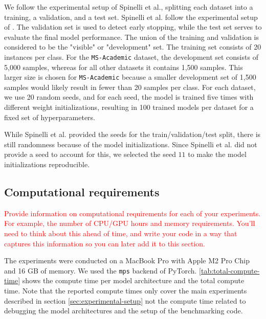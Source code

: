 \documentclass{gdl}
\begin{document}
We follow the experimental setup of Spinelli et al., splitting each dataset into a training, a validation, and a test set. Spinelli et al. follow the experimental setup of \cite{Klicpera2019}. The validation set is used to detect early stopping, while the test set serves to evaluate the final model performance. The union of the training and validation is considered to be the "visible" or "development" set. The training set consists of 20 instances per class. For the \texttt{MS-Academic} dataset, the development set consists of 5,000 samples, whereas for all other datasets it contains 1,500 samples. This larger size is chosen for \texttt{MS-Academic} because a smaller development set of 1,500 samples would likely result in fewer than 20 samples per class. For each dataset, we use 20 random seeds, and for each seed, the model is trained five times with different weight initializations, resulting in 100 trained models per dataset for a fixed set of hyperparameters.

While Spinelli et al. provided the seeds for the train/validation/test split, there is still randomness because of the model initializations. Since Spinelli et al. did not provide a seed to account for this, we selected the seed $11$ to make the model initializations reproducible. 


\subsection{Computational requirements}
\textcolor{red}{Provide information on computational requirements for each of your experiments. For example, the number of CPU/GPU hours and memory requirements. You'll need to think about this ahead of time, and write your code in a way that captures this information so you can later add it to this section. }

The experiments were conducted on a MacBook Pro with Apple M2 Pro Chip and 16 GB of memory. We used the \texttt{mps} backend of PyTorch. \autoref{tab:total-compute-time} shows the compute time per model architecture and the total compute time. Note that the reported compute times only cover the main experiments described in section \ref{sec:experimental-setup} not the compute time related to debugging the model architectures and the setup of the benchmarking code.
\end{document}
